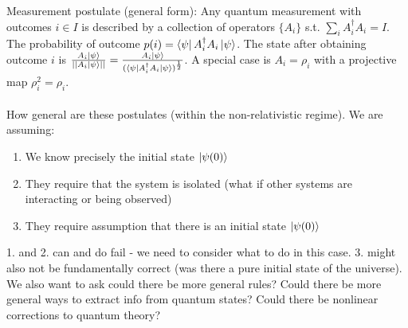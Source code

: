 \documentclass{article}
\begin{document}
       Measurement postulate (general form): Any quantum measurement with outcomes $i \in I$ is described by a collection of operators $\{ A_i \}$ s.t. $\sum_i A^{\dagger}_iA_i = I$. The probability of outcome $p(i) = \bra{\psi} A_i^{\dagger} A_i \ket{\psi}$. The state after obtaining outcome $i$ is $\frac{A_i \ket{\psi}}{|| A_i \ket{\psi}||} =  \frac{A_i \ket{\psi}}{( \bra{\psi} A_i^{\dagger} A_i \ket{\psi})^{\frac{1}{2}}}$. A special case is $A_i = \rho_i$ with a projective map $\rho_i^2 = \rho_i$.\\\\
       How general are these postulates (within the non-relativistic regime). We are assuming:\\
\begin{enumerate}
\item We know precisely the initial state $\ket{\psi(0)}$
\item They require that the system is isolated (what if other systems are interacting or being observed)
\item They require assumption that there is an initial state $\ket{\psi(0)}$
\end{enumerate}
1. and 2. can and do fail - we need to consider what to do in this case. 3. might also not be fundamentally correct (was there a pure initial state of the universe). We also want to ask could there be more general rules? Could there be more general ways to extract info from quantum states? Could there be nonlinear corrections to quantum theory?
\end{document}
